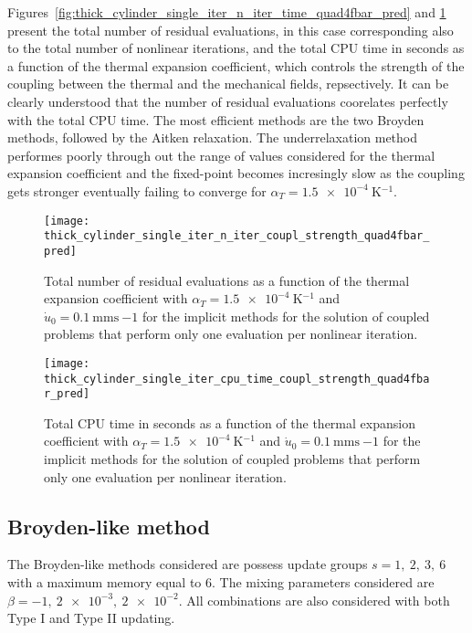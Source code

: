 Figures~\ref{fig:thick_cylinder_single_iter_n_iter_time_quad4fbar_pred} and \ref{fig:thick_cylinder_single_iter_n_iter_coupl_strength_quad4fbar_pred} present the total number of residual evaluations, in this case corresponding also to the total number of nonlinear iterations, and the total CPU time in seconds as a function of the thermal expansion coefficient, which controls the strength of the coupling between the thermal and the mechanical fields, repsectively.
It can be clearly understood that the number of residual evaluations coorelates perfectly with the total CPU time.
The most efficient methods are the two Broyden methods, followed by the Aitken relaxation.
The underrelaxation method performes poorly through out the range of values considered for the thermal expansion coefficient and the fixed-point becomes incresingly slow as the coupling gets stronger eventually failing to converge for \(\alpha_T=\SI{1.5e-4}{\kelvin^{-1}}\).

\begin{figure}
  \texttt{[image: thick\_cylinder\_single\_iter\_n\_iter\_coupl\_strength\_quad4fbar\_pred]}
  \caption{Total number of residual evaluations as a function of the thermal expansion coefficient with \(\alpha_T=\SI{1.5e-4}{\kelvin^{-1}}\) and \(\dot u_0 =\SI{0.1}{\milli\meter\second~{-1}}\) for the implicit methods for the solution of coupled problems that perform only one evaluation per nonlinear iteration.}
\label{fig:thick_cylinder_single_iter_n_iter_coupl_strength_quad4fbar_pred}
\end{figure}

\begin{figure}
  \texttt{[image: thick\_cylinder\_single\_iter\_cpu\_time\_coupl\_strength\_quad4fbar\_pred]}
  \caption{Total CPU time in seconds as a function of the thermal expansion coefficient with \(\alpha_T=\SI{1.5e-4}{\kelvin^{-1}}\) and \(\dot u_0 =\SI{0.1}{\milli\meter\second~{-1}}\) for the implicit methods for the solution of coupled problems that perform only one evaluation per nonlinear iteration.}
\label{fig:thick_cylinder_single_iter_cpu_time_coupl_strength_quad4fbar_pred}
\end{figure}


\subsection{Broyden-like method}

The Broyden-like methods considered are possess update groups \(s=1,\ 2,\ 3,\ 6\) with a maximum memory equal to 6.
The mixing parameters considered are \(\beta=-1,\ \num{2e-3},\ \num{2e-2}\).
All combinations are also considered with both Type I and Type II updating.

